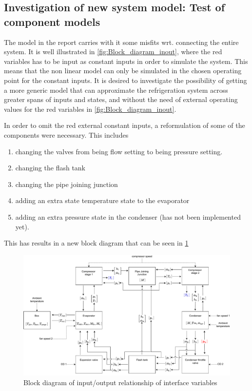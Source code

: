 \subsection{Investigation of new system model: Test of component models} \label{app:tj_2}
The model in the report carries with it some misfits wrt. connecting the entire system. It is well illustrated in \cref{fig:Block_diagram_inout}, where the red variables has to be input as constant inputs in order to simulate the system. This means that the non linear model can only be simulated in the chosen operating point for the constant inputs. It is desired to investigate the possibility of getting a more generic model that can approximate the refrigeration system across greater spans of inputs and states, and without the need of external operating values for the red variables in \cref{fig:Block_diagram_inout}.

In order to omit the red external constant inputs, a reformulation of some of the components were necessary. This includes 
\begin{enumerate}
	\item changing the valves from being flow setting to being pressure setting.
	\item changing the flash tank
	\item changing the pipe joining junction
	\item adding an extra state temperature state to the evaporator
	\item adding an extra pressure state in the condenser (has not been implemented yet).
\end{enumerate}

This has results in a new block diagram that can be seen in \cref{fig:Block_diagram_inout_valvePres}

\begin{figure}[h!]
	\centering
	\includegraphics[width=1\textwidth]{Graphics/Block_Diagram_inout.pdf}
	\caption{Block diagram of input/output relationship of interface variables}
	\label{fig:Block_diagram_inout_valvePres}
\end{figure} 
 
 
